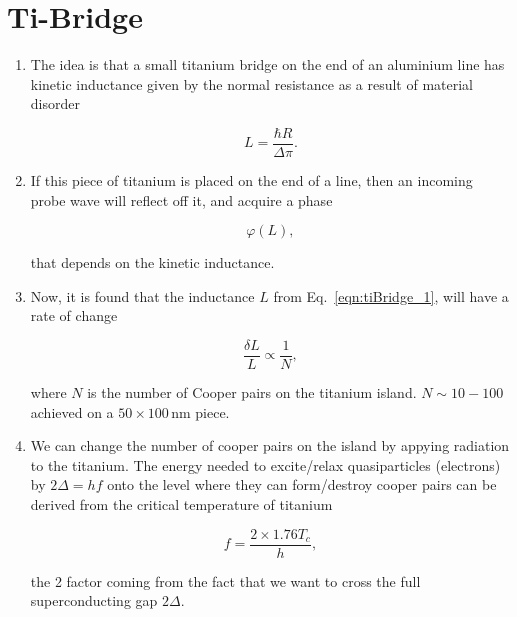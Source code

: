 \section{Ti-Bridge}

 \begin{enumerate}
 	\item The idea is that a small titanium bridge on the end of an aluminium line has kinetic inductance given by the normal resistance as a result of material disorder
 
 \begin{equation}\label{eqn:tiBridge_1}
 	L = \frac{\hbar R}{\Delta \pi}.
 \end{equation}
 
 
 \item If this piece of titanium is placed on the end of a line, then an incoming probe wave will reflect off it, and acquire a phase 
 
 \[
 	\varphi(L),
 \]
 
 \noindent that depends on the kinetic inductance. 
 
 \item Now, it is found that the inductance $ L $ from Eq.~\eqref{eqn:tiBridge_1}, will have a rate of change 
 
 \begin{equation}\label{eqn:tiBridge_2}
 	\frac{\delta L}{L} \propto \frac{1}{N},
 \end{equation}
 
 \noindent where $ N $ is the number of Cooper pairs on the titanium island. $ N\sim10-100 $ achieved on a $ 50\times100\,$nm piece.
 
 \item We can change the number of cooper pairs on the island by appying radiation to the titanium. The energy needed to excite/relax quasiparticles (electrons) by $ 2\Delta  = hf$ onto the level where they can form/destroy cooper pairs can be derived from the critical temperature of titanium
 
 \[
 	f = \frac{2\times 1.76 T_c}{h},
 \]
 
 \noindent the 2 factor coming from the fact that we want to cross the full superconducting gap $ 2\Delta $.
 \end{enumerate}


